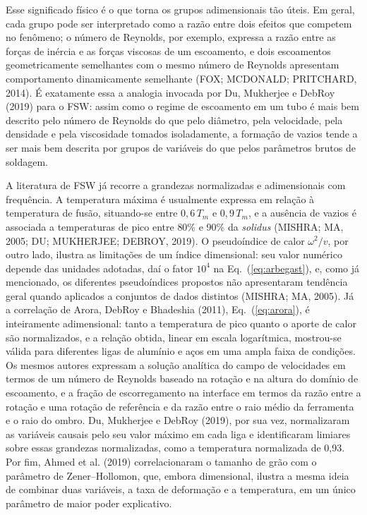 \documentclass[12pt,openany]{report}
\begin{document}
Esse significado físico é o que torna os grupos adimensionais tão úteis. Em geral, cada grupo pode ser interpretado como a razão entre dois efeitos que competem no fenômeno; o número de Reynolds, por exemplo, expressa a razão entre as forças de inércia e as forças viscosas de um escoamento, e dois escoamentos geometricamente semelhantes com o mesmo número de Reynolds apresentam comportamento dinamicamente semelhante (FOX; MCDONALD; PRITCHARD, 2014). É exatamente essa a analogia invocada por Du, Mukherjee e DebRoy (2019) para o FSW: assim como o regime de escoamento em um tubo é mais bem descrito pelo número de Reynolds do que pelo diâmetro, pela velocidade, pela densidade e pela viscosidade tomados isoladamente, a formação de vazios tende a ser mais bem descrita por grupos de variáveis do que pelos parâmetros brutos de soldagem.

A literatura de FSW já recorre a grandezas normalizadas e adimensionais com frequência. A temperatura máxima é usualmente expressa em relação à temperatura de fusão, situando-se entre $0{,}6\,T_m$ e $0{,}9\,T_m$, e a ausência de vazios é associada a temperaturas de pico entre 80\% e 90\% da \textit{solidus} (MISHRA; MA, 2005; DU; MUKHERJEE; DEBROY, 2019). O pseudoíndice de calor $\omega^{2}/v$, por outro lado, ilustra as limitações de um índice dimensional: seu valor numérico depende das unidades adotadas, daí o fator $10^{4}$ na Eq.~(\ref{eq:arbegast}), e, como já mencionado, os diferentes pseudoíndices propostos não apresentaram tendência geral quando aplicados a conjuntos de dados distintos (MISHRA; MA, 2005). Já a correlação de Arora, DebRoy e Bhadeshia (2011), Eq.~(\ref{eq:arora}), é inteiramente adimensional: tanto a temperatura de pico quanto o aporte de calor são normalizados, e a relação obtida, linear em escala logarítmica, mostrou-se válida para diferentes ligas de alumínio e aços em uma ampla faixa de condições. Os mesmos autores expressam a solução analítica do campo de velocidades em termos de um número de Reynolds baseado na rotação e na altura do domínio de escoamento, e a fração de escorregamento na interface em termos da razão entre a rotação e uma rotação de referência e da razão entre o raio médio da ferramenta e o raio do ombro. Du, Mukherjee e DebRoy (2019), por sua vez, normalizaram as variáveis causais pelo seu valor máximo em cada liga e identificaram limiares sobre essas grandezas normalizadas, como a temperatura normalizada de 0,93. Por fim, Ahmed et al. (2019) correlacionaram o tamanho de grão com o parâmetro de Zener--Hollomon, que, embora dimensional, ilustra a mesma ideia de combinar duas variáveis, a taxa de deformação e a temperatura, em um único parâmetro de maior poder explicativo.
\end{document}
